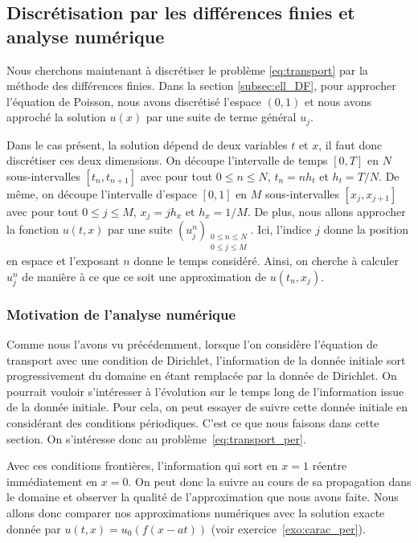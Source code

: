 \documentclass[12pt,a4paper,twoside]{article}
\begin{document}
\subsection{Discr\'etisation par les diff\'erences finies et analyse num\'erique}
\label{subsec:transport_DF}

Nous cherchons maintenant \`a discr\'etiser le probl\`eme \eqref{eq:transport}
par la m\'ethode des diff\'erences finies.
Dans la section \ref{subsec:ell_DF}, pour approcher l'\'equation de Poisson,
nous avons discr\'etis\'e l'espace $(0,1)$ et nous avons approch\'e la solution
$u(x)$ par une suite de terme g\'en\'eral $u_j$.

Dans le cas pr\'esent, la solution d\'epend de deux variables $t$ et $x$,
il faut donc discr\'etiser ces deux dimensions.
On d\'ecoupe l'intervalle de temps $[0,T]$ en $N$ sous-intervalles $[t_n , t_{n+1}]$
avec pour tout $0\leq n \leq N$,  $t_n = n h_t$ et $h_t = T/N$.
De m\^eme, on d\'ecoupe l'intervalle d'espace $[0,1]$ en $M$ sous-intervalles
$[x_j , x_{j+1}]$ avec pour tout $0 \leq j \leq M$, $x_j = j h_x$ et $h_x = 1/M$. 
De plus, nous allons approcher la fonction $u(t,x)$ par une suite
$(u_j^n)_{\substack{0 \leq n \leq N \\ 0 \leq j \leq M}}$.
Ici, l'indice $j$ donne la position en espace et l'exposant $n$
donne le temps consid\'er\'e. Ainsi, on cherche \`a calculer $u_j^n$ 
de mani\`ere \`a ce que ce soit une approximation
de $u(t_n, x_j)$.

\subsubsection{Motivation de l'analyse num\'erique}

Comme nous l'avons vu pr\'ec\'edemment, lorsque l'on consid\`ere
l'\'equation de transport avec une condition de Dirichlet,
l'information de la donn\'ee initiale sort progressivement du domaine
en \'etant remplac\'ee par la donn\'ee de Dirichlet.
On pourrait vouloir s'int\'eresser \`a l'\'evolution sur le temps long de 
l'information issue de la donn\'ee initiale.
Pour cela, on peut essayer de suivre cette donn\'ee
initiale en consid\'erant des conditions p\'eriodiques.
C'est ce que nous faisons dans cette section.
On s'int\'eresse donc au probl\`eme~\eqref{eq:transport_per}.

Avec ces conditions fronti\`eres, l'information qui sort en 
$x=1$ r\'eentre imm\'ediatement en $x=0$.
On peut donc la suivre au cours de sa propagation dans le domaine
et observer la qualit\'e de l'approximation que nous avons faite.
Nous allons donc comparer nos approximations num\'eriques avec la solution
exacte donn\'ee par $u(t,x) = u_0(f(x-at))$ (voir exercice~\ref{exo:carac_per}).
\end{document}
